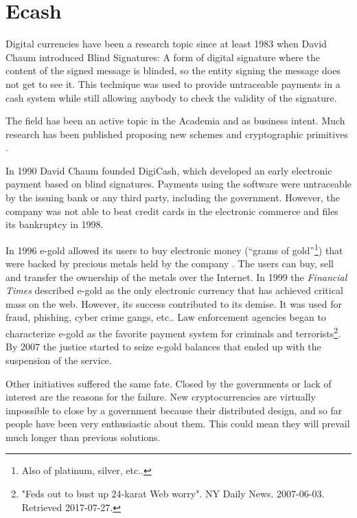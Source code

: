 \section{Ecash}
Digital currencies have been a research topic since at least 1983 when David
  Chaum \cite{chaum1983blind} introduced Blind Signatures: A form of digital
  signature where the content of the signed message is blinded, so the entity
  signing the message does not get to see it. This technique was used to provide
  untraceable payments in a cash system while still allowing anybody to check the
  validity of the signature.

The field has been an active topic in the Academia and as business intent.
  Much research has been published proposing new schemes and
  cryptographic primitives \cite{okamoto1991universal,chaum1992achieving,
  boly1994esprit,anderson1996netcard,lysyanskaya1998group}.

In 1990 David Chaum founded DigiCash, which developed an early electronic
  payment based on blind signatures. Payments using the software were
  untraceable by the issuing bank or any third party, including the government.
However, the company was not able to beat credit cards in the electronic
  commerce and files its bankruptcy in 1998.

In 1996 e-gold allowed its users to buy electronic money (``grams of
  gold''\footnote{Also of platinum, silver, etc..}) that were backed by precious
  metals held by the company \cite{hughes2007developments}.
The users can buy, sell and transfer the ownership of the metals over the
  Internet. In 1999 the \textit{Financial Times} described e-gold as the only
  electronic currency that has achieved critical mass on the web.
However, its success contributed to its demise. It was used for fraud, phishing,
  cyber crime gangs, etc.. Law enforcement agencies began to characterize
  e-gold as the favorite payment system for criminals and terrorists\footnote{%
  "Feds out to bust up 24-karat Web worry". NY Daily News. 2007-06-03. Retrieved
  2017-07-27.}. By 2007 the justice started to seize e-gold balances that ended up
  with the suspension of the service.

Other initiatives suffered the same fate.
Closed by the governments or lack of interest are the reasons for the
  failure.
New cryptocurrencies are virtually impossible to close by a government because
  their distributed design, and so far people have been very enthusiastic about
  them.
This could mean they will prevail much longer than previous solutions.

